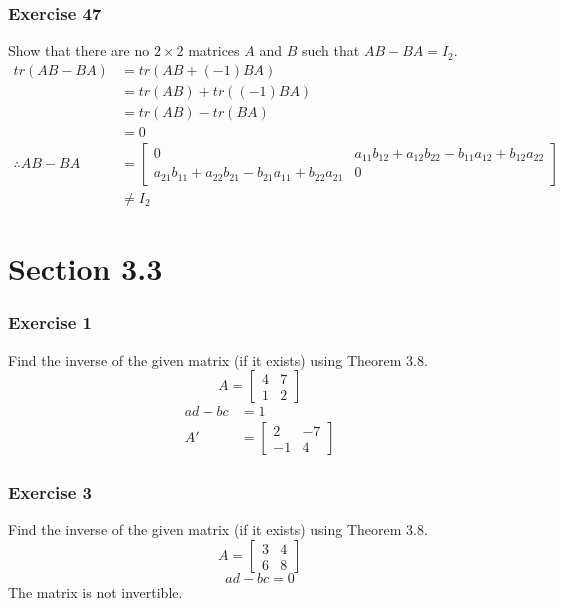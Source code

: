\documentclass[letterpaper, 12pt]{math}
\begin{document}
\subsubsection*{Exercise 47}
Show that there are no \( 2\times2 \) matrices \( A \) and \( B \) such that
\( AB-BA = I_2 \).
\begin{align*}
  tr(AB-BA) &= tr(AB+(-1)BA) \\
  &= tr(AB)+tr((-1)BA) \\
  &= tr(AB)-tr(BA) \\
  &= 0 \\
  \therefore AB-BA &= \begin{bmatrix}
    0 & a_{11}b_{12}+a_{12}b_{22}-b_{11}a_{12}+b_{12}a_{22} \\
    a_{21}b_{11}+a_{22}b_{21}-b_{21}a_{11}+b_{22}a_{21} & 0
  \end{bmatrix} \\
  &\ne I_2
\end{align*}

\section*{Section 3.3}

\subsubsection*{Exercise 1}
Find the inverse of the given matrix (if it exists) using Theorem 3.8.
\[ A = \begin{bmatrix}4 & 7 \\ 1 & 2\end{bmatrix} \]
\begin{align*}
  ad-bc &= 1 \\
  A' &= \begin{bmatrix}
    2 & -7 \\
    -1 & 4
  \end{bmatrix}
\end{align*}

\subsubsection*{Exercise 3}
Find the inverse of the given matrix (if it exists) using Theorem 3.8.
\[ A = \begin{bmatrix}3 & 4 \\ 6 & 8\end{bmatrix} \]
\[ ad-bc = 0 \]
The matrix is not invertible.
\end{document}
